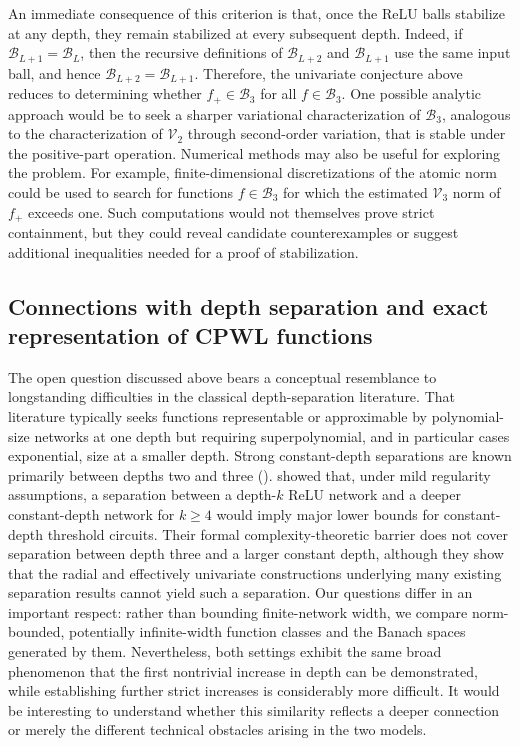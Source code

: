\documentclass{article}
\def\cB{{\mathcal{B}}}
\def\cV{{\mathcal{V}}}
\begin{document}
An immediate consequence of this criterion is that, once the ReLU balls stabilize at any depth, they remain stabilized at every subsequent depth. Indeed, if $\cB_{L+1} = \cB_L$, then the recursive definitions of $\cB_{L+2}$ and $\cB_{L+1}$ use the same input ball, and hence $\cB_{L+2}=\cB_{L+1}$. Therefore, the univariate conjecture above reduces to determining whether $f_+ \in \cB_3$ for all $f \in \cB_3$. One possible analytic approach would be to seek a sharper variational characterization of $\cB_3$, analogous to the characterization of $\cV_2$ through second-order variation, that is stable under the positive-part operation. Numerical methods may also be useful for exploring the problem. For example, finite-dimensional discretizations of the atomic norm could be used to search for functions $f\in \cB_3$ for which the estimated $\cV_3$ norm of $f_+$ exceeds one. Such computations would not themselves prove strict containment, but they could reveal candidate counterexamples or suggest additional inequalities needed for a proof of stabilization.



\subsection{Connections with depth separation and exact representation of CPWL functions}
The open question discussed above bears a conceptual resemblance to longstanding difficulties in the classical depth-separation literature. That literature typically seeks functions representable or approximable by polynomial-size networks at one depth but requiring superpolynomial, and in particular cases exponential, size at a smaller depth. Strong constant-depth separations are known primarily between depths two and three (\cite{daniely2017depth,eldan2016power,venturi2022depth,parkinson2024depth}). \cite{vardi2020neural} showed that, under mild regularity assumptions, a separation between a depth-$k$ ReLU network and a deeper constant-depth network for $k\geq 4$ would imply major lower bounds for constant-depth threshold circuits. Their formal complexity-theoretic barrier does not cover separation between depth three and a larger constant depth, although they show that the radial and effectively univariate constructions underlying many existing separation results cannot yield such a separation. Our questions differ in an important respect: rather than bounding finite-network width, we compare norm-bounded, potentially infinite-width function classes and the Banach spaces generated by them. Nevertheless, both settings exhibit the same broad phenomenon that the first nontrivial increase in depth can be demonstrated, while establishing further strict increases is considerably more difficult. It would be interesting to understand whether this similarity reflects a deeper connection or merely the different technical obstacles arising in the two models.
\end{document}
